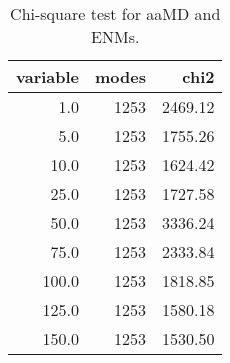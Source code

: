 \begin{table}[center]
\centering
\caption{Chi-square test for aaMD and ENMs.}
\label{tab:chi2}
\begin{tabular}{rrr}
\toprule
 variable &  modes &    chi2 \\
\midrule
      1.0 &   1253 & 2469.12 \\
      5.0 &   1253 & 1755.26 \\
     10.0 &   1253 & 1624.42 \\
     25.0 &   1253 & 1727.58 \\
     50.0 &   1253 & 3336.24 \\
     75.0 &   1253 & 2333.84 \\
    100.0 &   1253 & 1818.85 \\
    125.0 &   1253 & 1580.18 \\
    150.0 &   1253 & 1530.50 \\
\bottomrule
\end{tabular}
\end{table}
